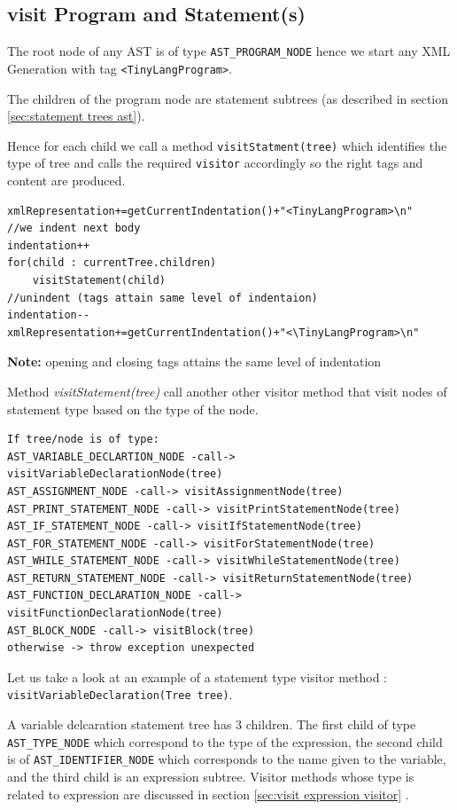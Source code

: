 \subsection{visit Program and Statement(s)}
The root node of any AST is of type \verb!AST_PROGRAM_NODE! hence we start any XML Generation with tag \verb!<TinyLangProgram>!. 


The children of the program node are statement subtrees (as described in section \ref{sec:statement trees ast}). 

Hence for each child we call a method \verb!visitStatment(tree)! which identifies the type of tree and calls the required \verb!visitor! accordingly so the right tags and content are produced. 
\begin{lstlisting}[caption=PSEUDOCODE of \emph{visitProgram(tree)}]
xmlRepresentation+=getCurrentIndentation()+"<TinyLangProgram>\n"
//we indent next body
indentation++
for(child : currentTree.children)
    visitStatement(child)
//unindent (tags attain same level of indentaion)
indentation--
xmlRepresentation+=getCurrentIndentation()+"<\TinyLangProgram>\n"
\end{lstlisting}
\textbf{Note:} opening and closing tags attains the same level of indentation

Method \emph{visitStatement(tree)} call another other visitor method that visit nodes of statement type based on the type of the node.

\begin{lstlisting}[caption=
PSEUDOCODE for \emph{visitStatement(tree)},label=listing:visit statement tree]
If tree/node is of type:
AST_VARIABLE_DECLARTION_NODE -call-> visitVariableDeclarationNode(tree)
AST_ASSIGNMENT_NODE -call-> visitAssignmentNode(tree)
AST_PRINT_STATEMENT_NODE -call-> visitPrintStatementNode(tree)
AST_IF_STATEMENT_NODE -call-> visitIfStatementNode(tree)
AST_FOR_STATEMENT_NODE -call-> visitForStatementNode(tree)
AST_WHILE_STATEMENT_NODE -call-> visitWhileStatementNode(tree)
AST_RETURN_STATEMENT_NODE -call-> visitReturnStatementNode(tree)
AST_FUNCTION_DECLARATION_NODE -call-> visitFunctionDeclarationNode(tree)
AST_BLOCK_NODE -call-> visitBlock(tree)
otherwise -> throw exception unexpected 
\end{lstlisting}


Let us take a look at an example of a statement type visitor method : \verb!visitVariableDeclaration(Tree tree)!.

A variable delcaration statement tree has 3 children. The first child of type \verb!AST_TYPE_NODE! which correspond to the type of the expression, the second child is  of \verb!AST_IDENTIFIER_NODE! which corresponds to the name given to the variable, and the third child is an expression subtree. Visitor methods whose type is related to expression are discussed in section \ref{sec:visit expression visitor}
.

